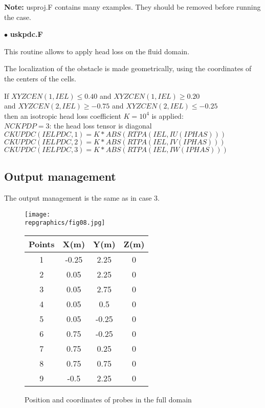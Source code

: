 \textbf{Note:} usproj.F contains many examples. They should be removed before
running the case.


$\bullet$ {\bfseries uskpdc.F}	

This routine allows to apply head loss on the fluid domain.

The localization of the obstacle is made geometrically, using the
coordinates of the centers of the cells.


If $XYZCEN(1,IEL) \leq 0.40$ and $XYZCEN(1,IEL) \geq 0.20$ \\
and $XYZCEN(2,IEL) \geq -0.75$ and $XYZCEN(2,IEL) \leq -0.25$\\
then an isotropic head loss coefficient $K = 10^{4}$ is applied:\\

$NCKPDP = 3$: the head loss tensor is diagonal \\
$CKUPDC(IELPDC,1) = K*ABS(RTPA(IEL,IU(IPHAS)))$ \\
$CKUPDC(IELPDC,2) = K*ABS(RTPA(IEL,IV(IPHAS)))$ \\
$CKUPDC(IELPDC,3) = K*ABS(RTPA(IEL,IW(IPHAS)))$

	\subsection{Output management}

The output management is the same as in case 3.

\begin{figure}[htp]
\parbox{8cm}{%
\centerline{\texttt{[image: \\repgraphics/fig08.jpg]}}}
\parbox{7cm}{%
\begin{center}
\begin{tabular}{|c|c|c|c|}
\hline
Points & X(m) & Y(m) & Z(m)\\
\hline
1 & -0.25 & 2.25 & 0 \\
\hline
2 & 0.05 & 2.25 & 0 \\
\hline
3 & 0.05 & 2.75 & 0 \\
\hline
4 & 0.05 & 0.5 & 0 \\
\hline
5 & 0.05 & -0.25 & 0 \\
\hline
6 & 0.75 & -0.25 & 0 \\
\hline
7 & 0.75 & 0.25 & 0 \\
\hline
8 & 0.75 & 0.75 & 0 \\
\hline
9 & -0.5 & 2.25 & 0 \\
\hline
\end{tabular}
\end{center}
}
\caption{Position and coordinates of probes in the full domain}
\label{figante42}
\end{figure}


